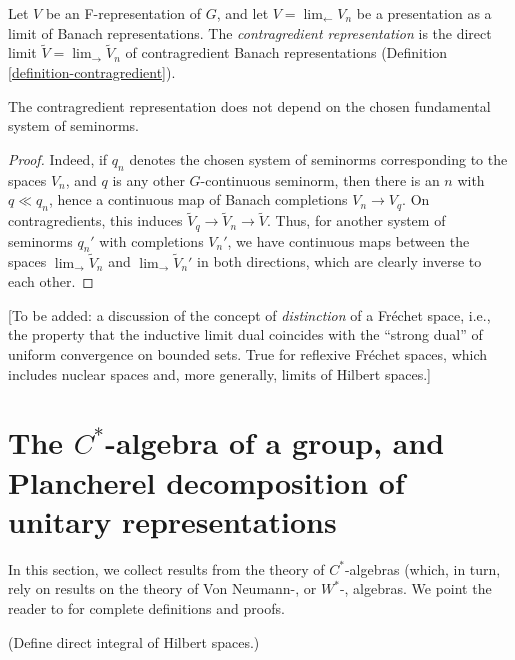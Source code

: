 \begin{definition}
 \label{definition-contragredient-F}
Let $V$ be an F-representation of $G$, and let $V= \lim_\leftarrow V_n$ be a presentation as a limit of Banach representations. The {\it contragredient representation} is the direct limit $\tilde V= \lim_\to \tilde V_n$ of contragredient Banach representations (Definition \ref{definition-contragredient}).
\end{definition}

\begin{lemma}
 \label{lemma-contragredient-norm}
The contragredient representation does not depend on the chosen fundamental system of seminorms. 
\end{lemma}

\begin{proof}
 Indeed, if $q_n$ denotes the chosen system of seminorms corresponding to the spaces $V_n$, and $q$ is any other $G$-continuous seminorm, then there is an $n$ with $q\ll q_n$, hence a continuous map of Banach completions $V_n\to V_q$. On contragredients, this induces $\tilde V_q \to \tilde V_n \to \tilde V$. Thus, for another system of seminorms $q_n'$ with completions $V_n'$, we have continuous maps between the spaces $\lim_\to \tilde V_n$ and $\lim_\to \tilde V_n'$ in both directions, which are clearly inverse to each other.
\end{proof}

[To be added: a discussion of the concept of \emph{distinction} of a Fr\'echet space, i.e., the property that the inductive limit dual coincides with the ``strong dual'' of uniform convergence on bounded sets. True for reflexive Fr\'echet spaces, which includes nuclear spaces and, more generally, limits of Hilbert spaces.]


\section{The $C^*$-algebra of a group, and Plancherel decomposition of unitary representations}
\label{section-Plancherel}

In this section, we collect results from the theory of $C^*$-algebras (which, in turn, rely on results on the theory of Von Neumann-, or $W^*$-, algebras. We point the reader to \cite{Dixmier-Cstar} for complete definitions and proofs.


\begin{definition}
 \label{definition-direct-integral}
(Define direct integral of Hilbert spaces.)
\end{definition}


